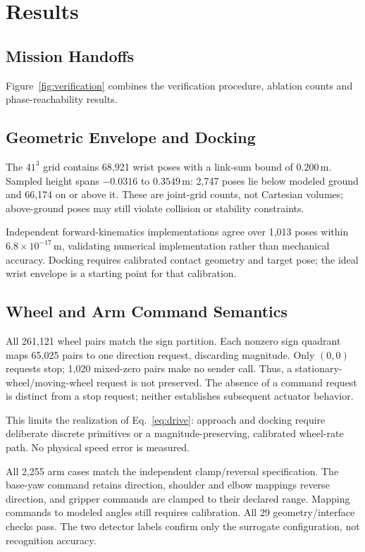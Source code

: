 \section{Results}
\subsection{Mission Handoffs}
Figure~\ref{fig:verification} combines the verification procedure, ablation counts and phase-reachability results.


\subsection{Geometric Envelope and Docking}
The $41^3$ grid contains 68,921 wrist poses with a link-sum bound of $0.200$\,m. Sampled height spans $-0.0316$ to $0.3549$\,m: 2,747 poses lie below modeled ground and 66,174 on or above it. These are joint-grid counts, not Cartesian volumes; above-ground poses may still violate collision or stability constraints.

Independent forward-kinematics implementations agree over 1,013 poses within $6.8\times10^{-17}$\,m, validating numerical implementation rather than mechanical accuracy. Docking requires calibrated contact geometry and target pose; the ideal wrist envelope is a starting point for that calibration.

\subsection{Wheel and Arm Command Semantics}
All 261,121 wheel pairs match the sign partition. Each nonzero sign quadrant maps 65,025 pairs to one direction request, discarding magnitude. Only $(0,0)$ requests stop; 1,020 mixed-zero pairs make no sender call. Thus, a stationary-wheel/moving-wheel request is not preserved. The absence of a command request is distinct from a stop request; neither establishes subsequent actuator behavior.

This limits the realization of Eq.~\ref{eq:drive}: approach and docking require deliberate discrete primitives or a magnitude-preserving, calibrated wheel-rate path. No physical speed error is measured.

All 2,255 arm cases match the independent clamp/reversal specification. The base-yaw command retains direction, shoulder and elbow mappings reverse direction, and gripper commands are clamped to their declared range. Mapping commands to modeled angles still requires calibration. All 29 geometry/interface checks pass. The two detector labels confirm only the surrogate configuration, not recognition accuracy.
